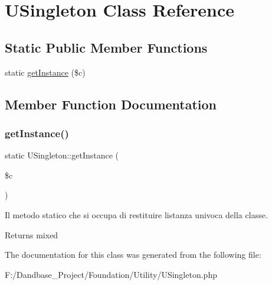 \hypertarget{class_u_singleton}{}\section{U\+Singleton Class Reference}
\label{class_u_singleton}
\subsection*{Static Public Member Functions}
\begin{DoxyCompactItemize}
\item 
static \mbox{\hyperlink{class_u_singleton_a8fba271e02053e500325b612ed9fe197}{get\+Instance}} (\$c)
\end{DoxyCompactItemize}


\subsection{Member Function Documentation}
\mbox{\label{class_u_singleton_a8fba271e02053e500325b612ed9fe197}} 
\subsubsection{\texorpdfstring{get\+Instance()}{getInstance()}}
{\footnotesize\ttfamily static U\+Singleton\+::get\+Instance (\begin{DoxyParamCaption}\item[{}]{\$c }\end{DoxyParamCaption})\hspace{0.3cm}{\ttfamily [static]}}

Il metodo statico che si occupa di restituire l\textquotesingle{}istanza univoca della classe.

\begin{DoxyReturn}{Returns}
mixed 
\end{DoxyReturn}


The documentation for this class was generated from the following file\+:\begin{DoxyCompactItemize}
\item 
F\+:/\+Dandbase\+\_\+\+Project/\+Foundation/\+Utility/U\+Singleton.\+php\end{DoxyCompactItemize}
